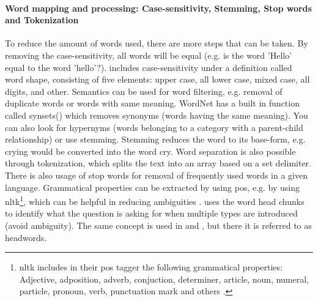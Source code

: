 \paragraph{Word mapping and processing: Case-sensitivity, Stemming, Stop words and Tokenization}
\label{sec:word_mapping_processing}
To reduce the amount of words used, there are more steps that can be taken. 
By removing the case-sensitivity, all words will be equal (e.g. is the word 'Hello' equal to the word 'hello'?).
\cite{Huang2008} includes case-sensitivity under a definition called word shape, consisting of five elements: upper case, all lower case, mixed case, all digits, and other.
\vspace{0.5em}\newline
Semantics can be used for word filtering, e.g. removal of duplicate words or words with same meaning. 
WordNet has a built in function called synsets() which removes synonyms (words having the same meaning). 
You can also look for hypernyms (words belonging to a category with a parent-child relationship) or use stemming.
Stemming reduces the word to its base-form, e.g. crying would be converted into the word cry.
Word separation is also possible through tokenization, which splits the text into an array based on a set delimiter.
There is also usage of stop words for removal of frequently used words in a given language.
\vspace{0.5em}\newline
Grammatical properties can be extracted by using \gls{pos}, e.g. by using \gls{nltk}\footnote{
	\gls{nltk} includes in their \gls{pos} tagger the following grammatical properties:
	Adjective, adposition, adverb, conjuction, determiner, article, noun, numeral, particle, pronoun, verb, 
	punctuation mark and others	 \cite[See Section 2.3]{StevenBird2015}.
}, which can be helpful in reducing ambiguities \cite{Bloehdorn2004}.
\textcite{Li} uses the word head chunks to identify what the question is asking for when multiple types are introduced (avoid ambiguity). 
The same concept is used in \cite{Huang2008} and \cite{Loni2011}, but there it is referred to as headwords.

